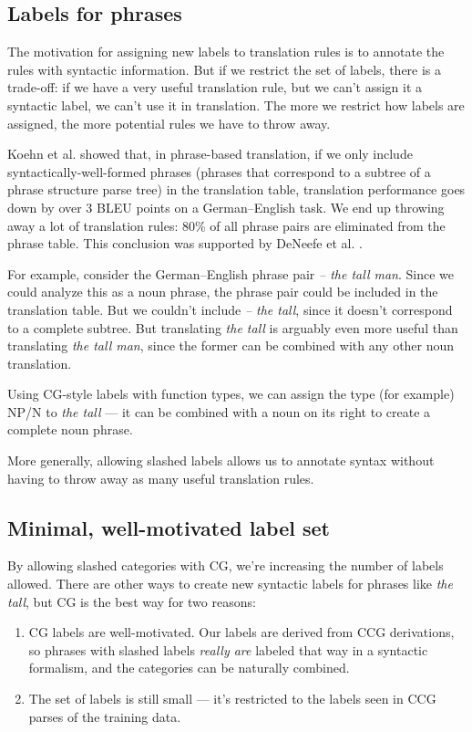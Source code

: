 \documentclass{article}
\begin{document}
\subsection{Labels for phrases}

The motivation for assigning new labels to translation rules is to annotate the rules with syntactic information. But if we restrict the set of labels, there is a trade-off: if we have a very useful translation rule, but we can't assign it a syntactic label, we can't use it in translation. The more we restrict how labels are assigned, the more potential rules we have to throw away.

Koehn et al.  showed that, in phrase-based translation, if we only include syntactically-well-formed phrases (phrases that correspond to a subtree of a phrase structure parse tree) in the translation table, translation performance goes down by over 3 BLEU points on a German--English task. We end up throwing away a lot of translation rules: 80\% of all phrase pairs are eliminated from the phrase table. This conclusion was supported by DeNeefe et al. .

For example, consider the German--English phrase pair {\em  -- the tall man}. Since we could analyze this as a noun phrase, the phrase pair could be included in the translation table. But we couldn't include {\em -- the tall}, since it doesn't correspond to a complete subtree. But translating {\em the tall} is arguably even more useful than translating {\em the tall man}, since the former can be combined with any other noun translation.

Using CG-style labels with function types, we can assign the type (for example) NP/N to {\em the tall} --- it can be combined with a noun on its right to create a complete noun phrase.

More generally, allowing slashed labels allows us to annotate syntax without having to throw away as many useful translation rules.

\subsection{Minimal, well-motivated label set}

By allowing slashed categories with CG, we're increasing the number of labels allowed. There are other ways to create new syntactic labels for phrases like {\em the tall}, but CG is the best way for two reasons:
\begin{enumerate}
\item CG labels are well-motivated. Our labels are derived from CCG derivations, so phrases with slashed labels {\em really are} labeled that way in a syntactic formalism, and the categories can be naturally combined.
\item The set of labels is still small --- it's restricted to the labels seen in CCG parses of the training data.
\end{enumerate}
\end{document}
